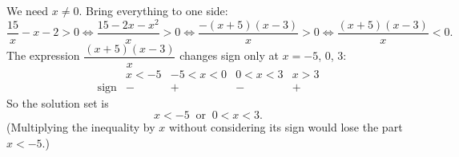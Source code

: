 We need $x\ne0$. Bring everything to one side:
\[
\dfrac{15}{x}-x-2>0\iff\dfrac{15-2x-x^2}{x}>0\iff\dfrac{-(x+5)(x-3)}{x}>0\iff\dfrac{(x+5)(x-3)}{x}<0 .
\]
The expression $\dfrac{(x+5)(x-3)}{x}$ changes sign only at $x=-5$, $0$, $3$:
\[
\begin{array}{c|cccc}
 & x<-5 & -5<x<0 & 0<x<3 & x>3\\\hline
\text{sign} & - & + & - & +
\end{array}
\]
So the solution set is
\[
\boxed{x<-5\ \text{ or }\ 0<x<3}.
\]
(Multiplying the inequality by $x$ without considering its sign would lose the part $x<-5$.)
